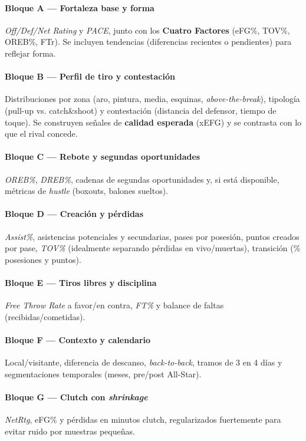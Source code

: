 \paragraph{Bloque A — Fortaleza base y forma}
\textit{Off/Def/Net Rating} y \textit{PACE}, junto con los \textbf{Cuatro Factores} (eFG\%, TOV\%, OREB\%, FTr). 
Se incluyen tendencias (diferencias recientes o pendientes) para reflejar forma.

\paragraph{Bloque B — Perfil de tiro y contestación}
Distribuciones por zona (aro, pintura, media, esquinas, \textit{above-the-break}), 
tipología (pull-up vs. catch\&shoot) y contestación (distancia del defensor, tiempo de toque). 
Se construyen señales de \textbf{calidad esperada} (xEFG) y se contrasta con lo que el rival concede.

\paragraph{Bloque C — Rebote y segundas oportunidades}
\textit{OREB\%}, \textit{DREB\%}, cadenas de segundas oportunidades y, si está disponible, métricas de \textit{hustle} (boxouts, balones sueltos).

\paragraph{Bloque D — Creación y pérdidas}
\textit{Assist\%}, asistencias potenciales y secundarias, pases por posesión, puntos creados por pase, 
\textit{TOV\%} (idealmente separando pérdidas en vivo/muertas), transición (\% posesiones y puntos).

\paragraph{Bloque E — Tiros libres y disciplina}
\textit{Free Throw Rate} a favor/en contra, \textit{FT\%} y balance de faltas (recibidas/cometidas).

\paragraph{Bloque F — Contexto y calendario}
Local/visitante, diferencia de descanso, \textit{back-to-back}, tramos de 3 en 4 días y segmentaciones temporales (meses, pre/post All-Star).

\paragraph{Bloque G — Clutch con \textit{shrinkage}}
\textit{NetRtg}, eFG\% y pérdidas en minutos clutch, regularizados fuertemente para evitar ruido por muestras pequeñas.

